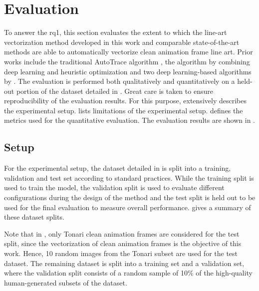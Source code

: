 \section{Evaluation}
\label{sec:eval}

To answer the \gls{rq1}, this section evaluates the extent to which the line-art vectorization method developed in this work and comparable state-of-the-art methods are able to automatically vectorize clean animation frame line art. Prior works include the traditional AutoTrace algorithm \citep{autotrace}, the algorithm by \citet{Puhachov2021KeypointPolyvector} combining deep learning and heuristic optimization and two deep learning-based algorithms by \citet{DBLP:conf/eccv/EgiazarianVAVST20,mo2021virtualsketching}. The evaluation is performed both qualitatively and quantitatively on a held-out portion of the dataset detailed in . Great care is taken to ensure reproducibility of the evaluation results. For this purpose,  extensively describes the experimental setup.  lists limitations of the experimental setup.  defines the metrics used for the quantitative evaluation. The evaluation results are shown in .

\subsection{Setup}
\label{sec:eval.setup}

For the experimental setup, the dataset detailed in  is split into a training, validation and test set according to standard practices. While the training split is used to train the model, the validation split is used to evaluate different configurations during the design of the method and the test split is held out to be used for the final evaluation to measure overall performance.  gives a summary of these dataset splits.

Note that in , only Tonari clean animation frames are considered for the test split, since the vectorization of clean animation frames is the objective of this work. Hence, 10 random images from the Tonari subset are used for the test dataset. The remaining dataset is split into a training set and a validation set, where the validation split consists of a random sample of 10\% of the high-quality human-generated subsets of the dataset.

